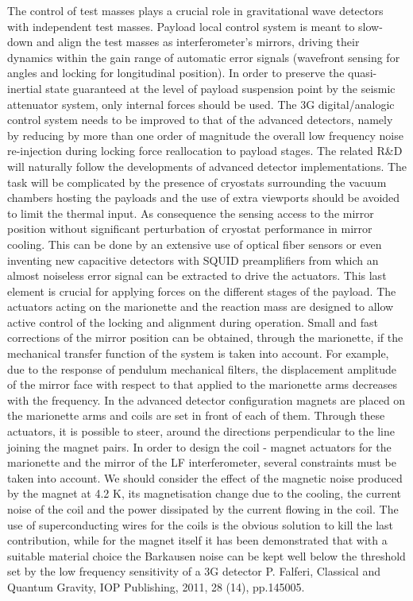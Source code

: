 The  control of test masses plays a crucial role in gravitational wave detectors with independent test masses. Payload local control system is meant to slow-down and align the test masses as interferometer’s mirrors, driving their dynamics within the gain range of automatic error signals (wavefront sensing for angles and locking for longitudinal position). In order to preserve the quasi-inertial state guaranteed at the level of payload suspension point by the seismic attenuator system, only internal forces should be used. The 3G digital/analogic control system needs to be improved to that of the advanced detectors, namely by reducing by more than one order of magnitude the overall low frequency noise re-injection during locking force reallocation to payload stages. The related R\&D will naturally follow the developments of advanced detector implementations. The task will be complicated by the presence of cryostats surrounding the vacuum chambers hosting the payloads and the use of extra viewports  should be avoided to limit the thermal input. 
As consequence the sensing access to the mirror position without significant perturbation of cryostat performance in mirror cooling. This can be done by an extensive use of optical fiber sensors or even inventing new capacitive  detectors with  SQUID preamplifiers from which an almost noiseless error signal can be extracted to drive the actuators. This last element is crucial for applying forces on the different  stages of the payload. The actuators acting on the marionette and the reaction mass are designed to allow active control of the locking and alignment during operation.
Small and fast corrections of the mirror position can be obtained, through the marionette, if the mechanical transfer function of the system is taken into account. For example, due to the response of pendulum mechanical filters, the displacement amplitude of the mirror face with respect to that applied to the marionette arms decreases with the frequency.
In the advanced detector configuration  magnets are placed on the marionette arms and coils  are set in front of each of them. Through these actuators, it is possible to steer, around the directions perpendicular  to the line  joining the magnet pairs. In order to design the coil - magnet actuators for the marionette and the mirror of the LF interferometer, several constraints must be taken into account.
We should consider the effect of the magnetic noise produced by the magnet at 4.2 K,  its magnetisation change due to the cooling, the current noise of the coil and the power dissipated by the current flowing in the coil. The use of superconducting wires for the coils is the obvious solution to kill the last contribution, while for the magnet itself it has been demonstrated that with a suitable material choice the Barkausen noise can be kept  well below the threshold set by the low frequency sensitivity of a 3G detector {\color{red} P. Falferi, Classical and Quantum Gravity, IOP Publishing, 2011, 28 (14), pp.145005}.

